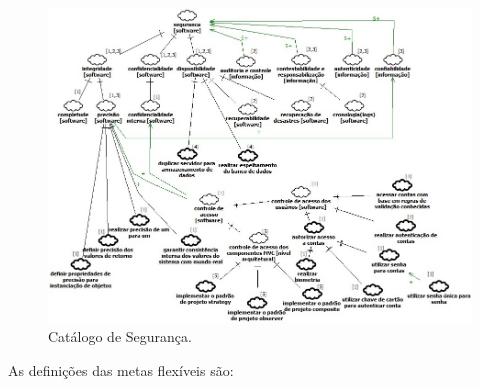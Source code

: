 \begin{figure}[h!]
	\centering
	\includegraphics[keepaspectratio=true,scale=0.7]{figuras/CatalogoDeSeguranca.JPG}
	\caption{Catálogo de Segurança.}
	\label{DetalhamentoPrimeiroNivel}
\end{figure}


As definições das metas flexíveis são: 

